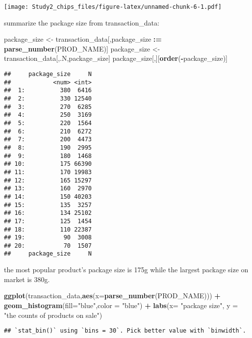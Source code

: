 \documentclass[
]{article}
\newenvironment{Shaded}{\begin{snugshade}}{\end{snugshade}}
\newcommand{\AttributeTok}[1]{\textcolor[rgb]{0.13,0.29,0.53}{#1}}
\newcommand{\FunctionTok}[1]{\textcolor[rgb]{0.13,0.29,0.53}{\textbf{#1}}}
\newcommand{\NormalTok}[1]{#1}
\newcommand{\OtherTok}[1]{\textcolor[rgb]{0.56,0.35,0.01}{#1}}
\newcommand{\SpecialCharTok}[1]{\textcolor[rgb]{0.81,0.36,0.00}{\textbf{#1}}}
\newcommand{\StringTok}[1]{\textcolor[rgb]{0.31,0.60,0.02}{#1}}
\begin{document}
\texttt{[image: Study2\_chips\_files/figure-latex/unnamed-chunk-6-1.pdf]}

summarize the package size from transaction\_data:

\begin{Shaded}
\begin{Highlighting}[]
\NormalTok{package\_size }\OtherTok{\textless{}{-}}\NormalTok{ transaction\_data[,package\_size }\SpecialCharTok{:=} \FunctionTok{parse\_number}\NormalTok{(PROD\_NAME)]}
\NormalTok{package\_size }\OtherTok{\textless{}{-}}\NormalTok{ transaction\_data[,.N,package\_size]}
\NormalTok{package\_size[,][}\FunctionTok{order}\NormalTok{(}\SpecialCharTok{{-}}\NormalTok{package\_size)]}
\end{Highlighting}
\end{Shaded}

\begin{verbatim}
##     package_size     N
##            <num> <int>
##  1:          380  6416
##  2:          330 12540
##  3:          270  6285
##  4:          250  3169
##  5:          220  1564
##  6:          210  6272
##  7:          200  4473
##  8:          190  2995
##  9:          180  1468
## 10:          175 66390
## 11:          170 19983
## 12:          165 15297
## 13:          160  2970
## 14:          150 40203
## 15:          135  3257
## 16:          134 25102
## 17:          125  1454
## 18:          110 22387
## 19:           90  3008
## 20:           70  1507
##     package_size     N
\end{verbatim}

the most popular product's package size is 175g while the largest
package size on market is 380g.

\begin{Shaded}
\begin{Highlighting}[]
\FunctionTok{ggplot}\NormalTok{(transaction\_data,}\FunctionTok{aes}\NormalTok{(}\AttributeTok{x=}\FunctionTok{parse\_number}\NormalTok{(PROD\_NAME))) }\SpecialCharTok{+} \FunctionTok{geom\_histogram}\NormalTok{(}\AttributeTok{fill=}\StringTok{"blue"}\NormalTok{,}\AttributeTok{color =} \StringTok{"blue"}\NormalTok{) }\SpecialCharTok{+} \FunctionTok{labs}\NormalTok{(}\AttributeTok{x=} \StringTok{"package size"}\NormalTok{, }\AttributeTok{y =} \StringTok{"the counts of products on sale"}\NormalTok{) }
\end{Highlighting}
\end{Shaded}

\begin{verbatim}
## `stat_bin()` using `bins = 30`. Pick better value with `binwidth`.
\end{verbatim}
\end{document}
